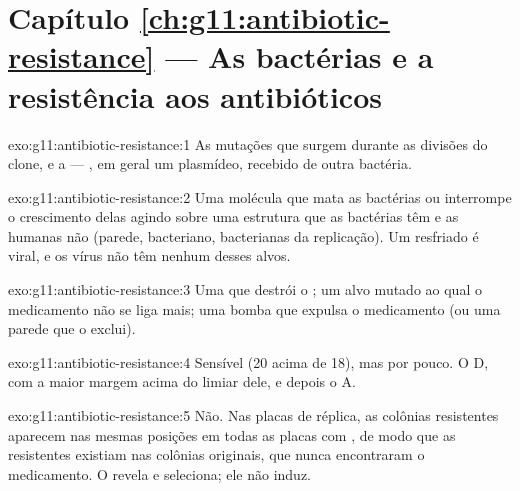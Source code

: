 \section*{Capítulo \ref{ch:g11:antibiotic-resistance} --- As bactérias e a resistência aos antibióticos}

\begin{solution}{exo:g11:antibiotic-resistance:1}
As mutações que surgem durante as divisões do clone, e a  --- , em geral um plasmídeo, recebido de outra
bactéria.
\end{solution}

\begin{solution}{exo:g11:antibiotic-resistance:2}
Uma molécula que mata as bactérias ou interrompe o crescimento delas
agindo sobre uma estrutura que as bactérias têm e as  humanas
não (parede,  bacteriano,  bacterianas da replicação).
Um resfriado é viral, e os vírus não têm nenhum desses alvos.
\end{solution}

\begin{solution}{exo:g11:antibiotic-resistance:3}
Uma  que destrói o ; um alvo mutado ao qual o
medicamento não se liga mais; uma bomba que expulsa o medicamento (ou
uma parede que o exclui).
\end{solution}

\begin{solution}{exo:g11:antibiotic-resistance:4}
Sensível (20 acima de 18), mas por pouco. O D, com a maior margem acima
do limiar dele, e depois o A.
\end{solution}

\begin{solution}{exo:g11:antibiotic-resistance:5}
Não. Nas placas de réplica, as colônias resistentes aparecem nas mesmas
posições em todas as placas com , de modo que as 
resistentes existiam nas colônias originais, que nunca encontraram o
medicamento. O  revela e seleciona; ele não induz.
\end{solution}

